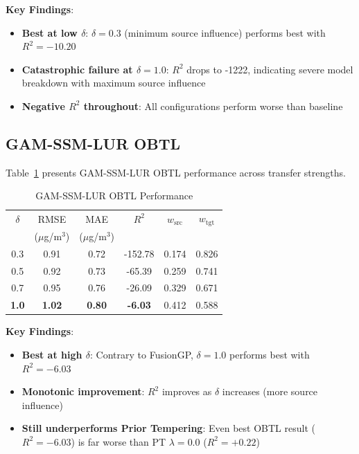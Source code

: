 \textbf{Key Findings}:
\begin{itemize}
    \item \textbf{Best at low \(\delta\)}: \(\delta=0.3\) (minimum source influence) performs best with \(R^2=-10.20\)
    \item \textbf{Catastrophic failure at \(\delta=1.0\)}: \(R^2\) drops to -1222, indicating severe model breakdown with maximum source influence
    \item \textbf{Negative \(R^2\) throughout}: All configurations perform worse than baseline
\end{itemize}

\subsection{GAM-SSM-LUR OBTL}
\label{subsec:gam_obtl}

Table~\ref{tab:gam_obtl} presents GAM-SSM-LUR OBTL performance across transfer strengths.

\begin{table}[htbp]
\centering
\caption{GAM-SSM-LUR OBTL Performance}
\label{tab:gam_obtl}
\small
\begin{tabular}{cccccc}
\toprule
\(\delta\) & RMSE & MAE & \(R^2\) & \(w_{\text{src}}\) & \(w_{\text{tgt}}\) \\
 & (\(\mu\)g/m\(^3\)) & (\(\mu\)g/m\(^3\)) &  &  &  \\
\midrule
0.3 & 0.91 & 0.72 & -152.78 & 0.174 & 0.826 \\
0.5 & 0.92 & 0.73 & -65.39 & 0.259 & 0.741 \\
0.7 & 0.95 & 0.76 & -26.09 & 0.329 & 0.671 \\
\textbf{1.0} & \textbf{1.02} & \textbf{0.80} & \textbf{-6.03} & 0.412 & 0.588 \\
\bottomrule
\end{tabular}
\end{table}

\textbf{Key Findings}:
\begin{itemize}
    \item \textbf{Best at high \(\delta\)}: Contrary to FusionGP, \(\delta=1.0\) performs best with \(R^2=-6.03\)
    \item \textbf{Monotonic improvement}: \(R^2\) improves as \(\delta\) increases (more source influence)
    \item \textbf{Still underperforms Prior Tempering}: Even best OBTL result (\(R^2=-6.03\)) is far worse than PT \(\lambda=0.0\) (\(R^2=+0.22\))
\end{itemize}

